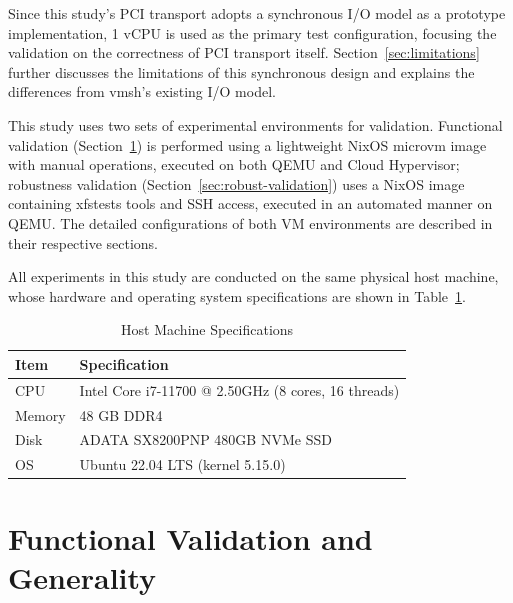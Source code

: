 \begin{ZhChapter}
Since this study's PCI transport adopts a synchronous I/O model as a prototype implementation, 1 vCPU is used as the primary test configuration, focusing the validation on the correctness of PCI transport itself. Section~\ref{sec:limitations} further discusses the limitations of this synchronous design and explains the differences from vmsh's existing I/O model.

This study uses two sets of experimental environments for validation. Functional validation (Section~\ref{sec:func-validation}) is performed using a lightweight NixOS microvm image with manual operations, executed on both QEMU and Cloud Hypervisor; robustness validation (Section~\ref{sec:robust-validation}) uses a NixOS image containing xfstests tools and SSH access, executed in an automated manner on QEMU. The detailed configurations of both VM environments are described in their respective sections.

All experiments in this study are conducted on the same physical host machine, whose hardware and operating system specifications are shown in Table~\ref{tab:host-spec}.

\begin{table}[htbp]
    \centering
    \caption{Host Machine Specifications}
    \label{tab:host-spec}
    \renewcommand\arraystretch{1.5}{
        \begin{tabular}{| l | l |}
        \hline
        Item & Specification \\
        \hline
        CPU & Intel Core i7-11700 @ 2.50GHz (8 cores, 16 threads) \\
        \hline
        Memory & 48 GB DDR4 \\
        \hline
        Disk & ADATA SX8200PNP 480GB NVMe SSD \\
        \hline
        OS & Ubuntu 22.04 LTS (kernel 5.15.0) \\
        \hline
        \end{tabular}
    }
\end{table}

\section{Functional Validation and Generality}
\label{sec:func-validation}


\end{ZhChapter}
